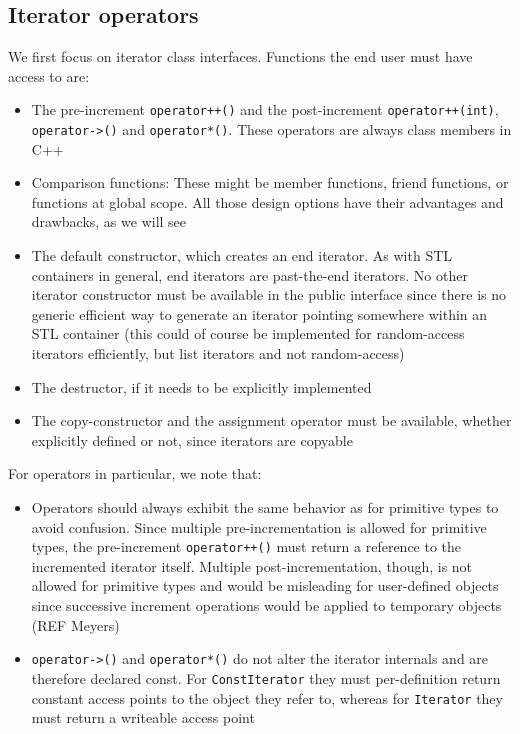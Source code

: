 \subsection{Iterator operators}
We first focus on iterator class interfaces. Functions the end user must have access to are:
\begin{itemize}
\item The pre-increment \lstinline!operator++()! and the post-increment \lstinline!operator++(int)!, \lstinline!operator->()! and \lstinline!operator*()!. These operators are always class members in C++
\item Comparison functions: These might be member functions, friend functions, or functions at global scope. All those design options have their advantages and drawbacks, as we will see
\item The default constructor, which creates an end iterator. As with STL containers in general, end iterators are past-the-end iterators. No other iterator constructor must be available in the public interface since there is no generic efficient way to generate an iterator pointing somewhere within an STL container (this could of course be implemented for random-access iterators efficiently, but list iterators and not random-access)
\item The destructor, if it needs to be explicitly implemented
\item The copy-constructor and the assignment operator must be available, whether explicitly defined or not, since iterators are copyable
\end{itemize}

For operators in particular, we note that:
\begin{itemize}
\item Operators should always exhibit the same behavior as for primitive types to avoid confusion. Since multiple pre-incrementation is allowed for primitive types, the pre-increment \lstinline!operator++()! must return a reference to the incremented iterator itself. Multiple post-incrementation, though, is not allowed for primitive types and would be misleading for user-defined objects since successive increment operations would be applied to temporary objects (REF Meyers)
\item \lstinline!operator->()! and \lstinline!operator*()! do not alter the iterator internals and are therefore declared const. For \lstinline!ConstIterator! they must per-definition return constant access points to the object they refer to, whereas for \lstinline!Iterator! they must return a writeable access point
\end{itemize}


